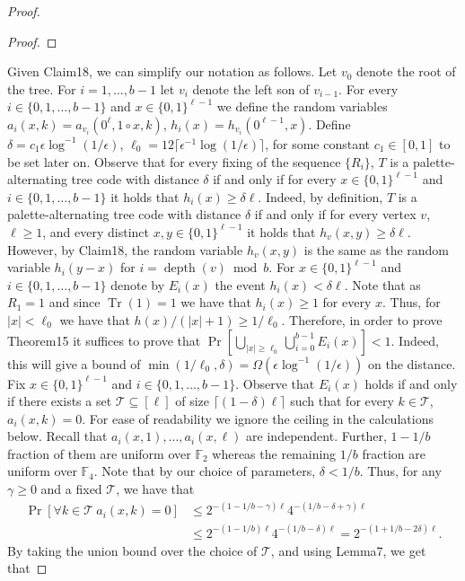\documentclass[10pt,a4paper]{article}
\begin{document}
\begin{proof}
\begin{proof}
\end{proof}
Given Claim18, we can simplify our notation as follows. Let $v_0$ denote the root of the tree. For $i=1,\ldots,b-1$ let $v_i$ denote the left son of $v_{i-1}$. For every $i\in\{0,1,\ldots,b-1\}$ and $x\in\{0,1\}^{\ell-1}$ we define the random variables $a_i(x,k)=a_{v_i}(0^\ell,1\circ x,k)$, $h_i(x)=h_{v_i}(0^{\ell-1},x)$.
Define $\delta=c_1\epsilon\log^{-1}(1/\epsilon)$, $\ell_0=12\lceil\epsilon^{-1}\log(1/\epsilon)\rceil$, for some constant $c_1\in[0,1]$ to be set later on. Observe that for every fixing of the sequence $\{R_i\}$, $T$ is a palette-alternating tree code with distance $\delta$ if and only if for every $x\in\{0,1\}^{\ell-1}$ and $i\in\{0,1,\ldots,b-1\}$ it holds that $h_i(x)\ge\delta\ell$. Indeed, by definition, $T$ is a palette-alternating tree code with distance $\delta$ if and only if for every vertex $v$, $\ell\ge1$, and every distinct $x,y\in\{0,1\}^{\ell-1}$ it holds that $h_v(x,y)\ge\delta\ell$. However, by Claim18, the random variable $h_v(x,y)$ is the same as the random variable $h_i(y-x)$ for $i=\operatorname{depth}(v)\bmod b$.
For $x\in\{0,1\}^{\ell-1}$ and $i\in\{0,1,\ldots,b-1\}$ denote by $E_i(x)$ the event $h_i(x)<\delta\ell$. Note that as $R_1=1$ and since $\operatorname{Tr}(1)=1$ we have that $h_i(x)\ge1$ for every $x$. Thus, for $|x|<\ell_0$ we have that $h(x)/(|x|+1)\ge1/\ell_0$. Therefore, in order to prove Theorem15 it suffices to prove that $\Pr[\bigcup_{|x|\ge\ell_0}\bigcup_{i=0}^{b-1}E_i(x)]<1$.
Indeed, this will give a bound of $\min(1/\ell_0,\delta)=\Omega(\epsilon\log^{-1}(1/\epsilon))$ on the distance.
Fix $x\in\{0,1\}^{\ell-1}$ and $i\in\{0,1,\ldots,b-1\}$. Observe that $E_i(x)$ holds if and only if there exists a set $\mathcal T\subseteq[\ell]$ of size $\lceil(1-\delta)\ell\rceil$ such that for every $k\in\mathcal T$, $a_i(x,k)=0$. For ease of readability we ignore the ceiling in the calculations below. Recall that $a_i(x,1),\ldots,a_i(x,\ell)$ are independent. Further, $1-1/b$ fraction of them are uniform over $\mathbb F_2$ whereas the remaining $1/b$ fraction are uniform over $\mathbb F_4$. Note that by our choice of parameters, $\delta<1/b$. Thus, for any $\gamma\ge0$ and a fixed $\mathcal T$, we have that
\begin{align*}
\Pr[\forall k\in\mathcal T\ a_i(x,k)=0]
&\le2^{-(1-1/b-\gamma)\ell}4^{-(1/b-\delta+\gamma)\ell}\\
&\le2^{-(1-1/b)\ell}4^{-(1/b-\delta)\ell}
=2^{-(1+1/b-2\delta)\ell}.
\end{align*}
By taking the union bound over the choice of $\mathcal T$, and using Lemma7, we get that

\end{proof}
\end{document}
